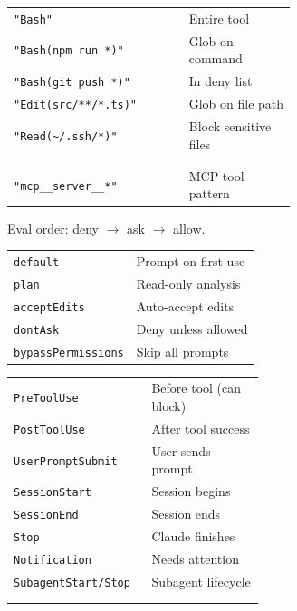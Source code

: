\documentclass[10pt]{extarticle}
\begin{document}
\begin{multicols}{2}
\begin{tabularx}{\linewidth}{@{}>{\raggedright\arraybackslash}p{0.62\linewidth}@{\enspace}Y@{}}
\texttt{"Bash"}                      & Entire tool \\
\texttt{"Bash(npm run *)"}          & Glob on command \\
\texttt{"Bash(git push *)"}         & In deny list \\
\texttt{"Edit(src/**/*.ts)"}        & Glob on file path \\
\texttt{"Read(\~{}/.ssh/*)"}        & Block sensitive files \\
 & \\
 \\
\texttt{"mcp\_\_server\_\_*"}       & MCP tool pattern \\
\end{tabularx}
{\footnotesize Eval order: deny $\to$ ask $\to$ allow.}

\begin{tabularx}{\linewidth}{@{}l@{\enspace}Y@{}}
\texttt{default}                     & Prompt on first use \\
\texttt{plan}                        & Read-only analysis \\
\texttt{acceptEdits}                 & Auto-accept edits \\
\texttt{dontAsk}                     & Deny unless allowed \\
\texttt{bypassPermissions}          & Skip all prompts \\
\end{tabularx}

\begin{tabularx}{\linewidth}{@{}>{\raggedright\arraybackslash}p{0.55\linewidth}@{\enspace}Y@{}}
\texttt{PreToolUse}                  & Before tool (can block) \\
\texttt{PostToolUse}                 & After tool success \\
\texttt{UserPromptSubmit}           & User sends prompt \\
\texttt{SessionStart}               & Session begins \\
\texttt{SessionEnd}                  & Session ends \\
\texttt{Stop}                        & Claude finishes \\
\texttt{Notification}               & Needs attention \\
\texttt{SubagentStart/Stop}         & Subagent lifecycle \\
 & \\
 \\
\end{tabularx}


\end{multicols}
\end{document}

